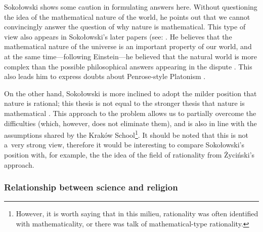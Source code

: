 \documentclass[%
  manuscript=article,
  year=2024,
  volume=77,
  doi=00000.000,
]{zfn}
\begin{document}
Sokołowski shows some caution in formulating answers here. Without questioning the idea of the mathematical nature of the world, he points out that we cannot convincingly answer the question of why nature is mathematical. This type of view also appears in Sokołowski's later papers (see: 
\parencite[][p.65]{}. %
 He believes that the mathematical nature of the universe is an important property of our world, and at the same time---following Einstein---he believed that the natural world is more complex than the possible philosophical answers appearing in the dispute 
\parencites[][pp.190–191]{}[][p.67]{}. %
 This also leads him to express doubts about Penrose-style Platonism 
\parencite[][p.218]{}.%




On the other hand, Sokołowski is more inclined to adopt the milder position that nature is rational; this thesis is not equal to the stronger thesis that nature is mathematical 
\parencite[][p.215]{}. %
 This approach to the problem allows us to partially overcome the difficulties (which, however, does not eliminate them), and is also in line with the assumptions shared by the Kraków School\footnote{However, it is worth saying that in this milieu, rationality was often identified with mathematicality, or there was talk of mathematical-type rationality.}. It should be noted that this is not a~very strong view, therefore it would be interesting to compare Sokołowski's position with, for example, the the idea of the field of rationality from Życiński's approach.



\subsubsection{Relationship between science and religion}
\end{document}
